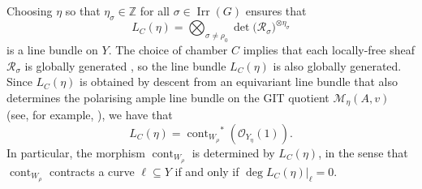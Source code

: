 \documentclass[11pt,reqno]{amsart}
\numberwithin{equation}{section}
\theoremstyle{definition}
\newcommand{\ZZ}{\ensuremath{\mathbb{Z}}}
\newcommand{\cont}{\operatorname{cont}}
\newcommand{\0}{\operatorname{0}}
\newcommand{\Irr}{\operatorname{Irr}}
\begin{document}
 Choosing $\eta$ so that $\eta_\sigma\in \ZZ$ for all $\sigma\in \Irr(G)$ ensures that
 \begin{equation}
 \label{eqn:LC+eta}
 L_{C}(\eta) = \bigotimes_{\sigma\neq \rho_0} \det \big(\mathcal{R}_\sigma\big)^{\otimes \eta_\sigma}
 \end{equation}
is a line bundle on $Y$. The choice of chamber $C$ implies that each locally-free sheaf $\mathcal{R}_\sigma$ is globally generated \cite[Proposition~2.4]{CIK18}, 
so the line bundle $L_{C}(\eta)$ is also globally generated. Since $L_C(\eta)$ is obtained by descent from an equivariant line bundle that also determines the polarising ample line bundle on the GIT quotient $\mathcal{M}_\eta(A,v)$ (see, for example, \cite[(2.2)]{BCS26}), we have that 
\[
L_{C}(\eta) = {\cont_{W_\rho}}^*(\mathcal{O}_{Y_\eta}(1)).
\]
In particular, the morphism $\cont_{W_\rho}$ is determined by $L_C(\eta)$, in the sense that $\cont_{W_\rho}$ contracts a curve $\ell\subseteq Y$ if and only if $\deg L_C(\eta)\vert_\ell = 0$.
\end{document}
